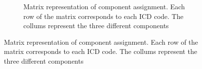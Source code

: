 \documentclass[
  sn-mathphys-num,
]{sn-jnl}
\begin{document}
\begin{figure}
\begin{minipage}{0.71\linewidth}
\begin{figure}[H]
\end{figure}%

\end{minipage}%
%
\begin{minipage}{0.29\linewidth}

\begin{figure}[H]


\caption{\label{fig-3-matrix}Matrix representation of component
assignment. Each row of the matrix corresponds to each ICD code. The
collums represent the three different components}

\end{figure}%

\end{minipage}%

\end{figure}%
\end{document}
